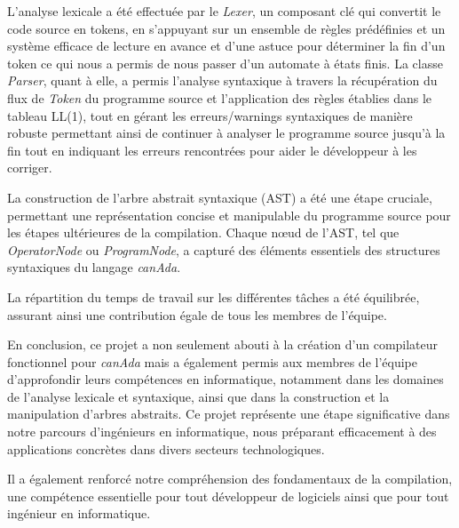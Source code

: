 \documentclass[french,a4paper]{article}
\begin{document}
    L'analyse lexicale a été effectuée par le \textit{Lexer}, un composant clé qui convertit le code source en tokens, en s'appuyant sur un ensemble de règles prédéfinies et un système efficace de lecture en avance et d'une astuce pour déterminer la fin d'un token ce qui nous a permis de nous passer d'un automate à états finis.
    La classe \textit{Parser}, quant à elle, a permis l'analyse syntaxique à travers la récupération du flux de \textit{Token} du programme source et l'application des règles établies dans le tableau LL(1), tout en gérant les erreurs/warnings syntaxiques de manière robuste permettant ainsi de continuer à analyser le programme source jusqu'à la fin tout en indiquant les erreurs rencontrées pour aider le développeur à les corriger.

    La construction de l'arbre abstrait syntaxique (AST) a été une étape cruciale, permettant une représentation concise et manipulable du programme source pour les étapes ultérieures de la compilation.
    Chaque nœud de l'AST, tel que \textit{OperatorNode} ou \textit{ProgramNode}, a capturé des éléments essentiels des structures syntaxiques du langage \textit{canAda}.

    La répartition du temps de travail sur les différentes tâches a été équilibrée, assurant ainsi une contribution égale de tous les membres de l'équipe.

    En conclusion, ce projet a non seulement abouti à la création d'un compilateur fonctionnel pour \textit{canAda} mais a également permis aux membres de l'équipe d'approfondir leurs compétences en informatique, notamment dans les domaines de l'analyse lexicale et syntaxique, ainsi que dans la construction et la manipulation d'arbres abstraits.
    Ce projet représente une étape significative dans notre parcours d'ingénieurs en informatique, nous préparant efficacement à des applications concrètes dans divers secteurs technologiques.

    Il a également renforcé notre compréhension des fondamentaux de la compilation, une compétence essentielle pour tout développeur de logiciels ainsi que pour tout ingénieur en informatique.
\end{document}
